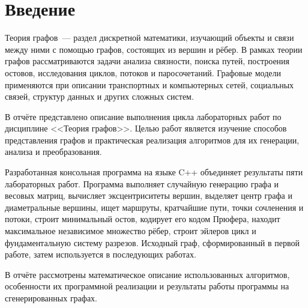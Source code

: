 \section*{Введение}

Теория графов~--- раздел дискретной математики, изучающий объекты и связи между ними с помощью графов, состоящих из вершин и рёбер. В рамках теории графов рассматриваются задачи анализа связности, поиска путей, построения остовов, исследования циклов, потоков и паросочетаний. Графовые модели применяются при описании транспортных и компьютерных сетей, социальных связей, структур данных и других сложных систем.

В отчёте представлено описание выполнения цикла лабораторных работ по дисциплине <<Теория графов>>. Целью работ является изучение способов представления графов и практическая реализация алгоритмов для их генерации, анализа и преобразования.

Разработанная консольная программа на языке C++ объединяет результаты пяти лабораторных работ. Программа выполняет случайную генерацию графа и весовых матриц, вычисляет эксцентриситеты вершин, выделяет центр графа и диаметральные вершины, ищет маршруты, кратчайшие пути, точки сочленения и потоки, строит минимальный остов, кодирует его кодом Прюфера, находит максимальное независимое множество рёбер, строит эйлеров цикл и фундаментальную систему разрезов. Исходный граф, сформированный в первой работе, затем используется в последующих работах.

В отчёте рассмотрены математическое описание использованных алгоритмов, особенности их программной реализации и результаты работы программы на сгенерированных графах.
